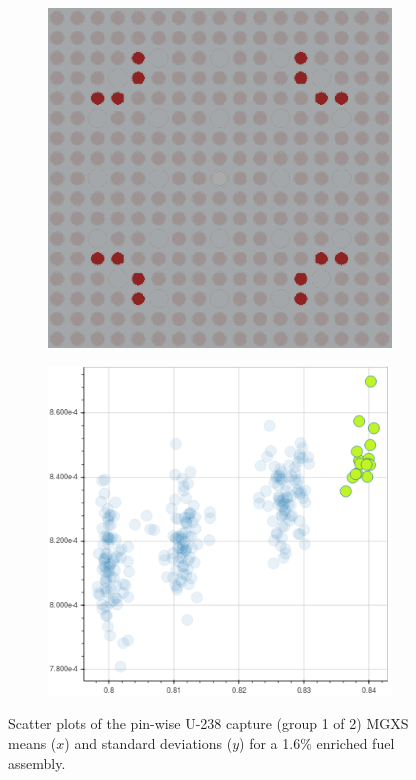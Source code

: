 \documentclass[12pt,twoside]{mitthesis-exec}
\begin{document}
\begin{figure}[h!]
\begin{subfigure}{0.45\textwidth}
  \caption{}
  \label{fig:capt-mean-std-mgxs}
\end{subfigure}
\begin{subfigure}{0.45\textwidth}
  \centering
  \includegraphics[width=0.9\linewidth]{figures/unsupervised/features/assm-16/u238-capt/mean-std/geometry-3}
  \caption{}
  \label{fig:capt-mean-std-geom-3}
\end{subfigure}%
\begin{subfigure}{0.45\textwidth}
  \centering
  \includegraphics[width=0.9\linewidth]{figures/unsupervised/features/assm-16/u238-capt/mean-std/mgxs-3}
  \caption{}
  \label{fig:capt-mean-std-mgxs-3}
\end{subfigure}
\caption[Clustering of U-238 capture MGXS standard deviations]{Scatter plots of the pin-wise U-238 capture (group 1 of 2) MGXS means ($x$) and standard deviations ($y$) for a 1.6\% enriched fuel assembly.}
\label{fig:capt-mean-std}
\end{figure}
\end{document}
